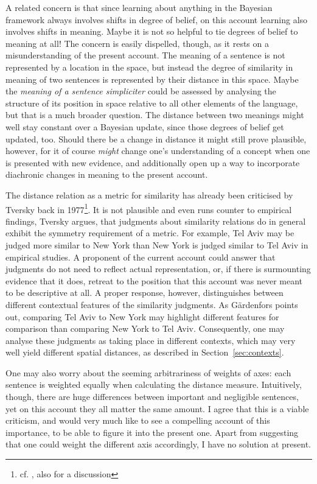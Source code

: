 \documentclass[11pt, a4paper]{scrartcl}
\renewcommand{\i}[1]{\emph{#1}}
\begin{document}
A related concern is that since learning about anything in the Bayesian framework always involves shifts in degree of belief, on this account learning also involves shifts in meaning. Maybe it is not so helpful to tie degrees of belief to meaning at all! The concern is easily dispelled, though, as it rests on a misunderstanding of the present account. The meaning of a sentence is not represented by a location in the space, but instead the degree of similarity in meaning of two sentences is represented by their distance in this space. Maybe the \i{meaning of a sentence simpliciter} could be assessed by analysing the structure of its position in space relative to all other elements of the language, but that is a much broader question. The distance between two meanings might well stay constant over a Bayesian update, since those degrees of belief get updated, too. Should there be a change in distance it might still prove plausible, however, for it of course \i{might} change one's understanding of a concept when one is presented with new evidence, and additionally open up a way to incorporate diachronic changes in meaning to the present account.

The distance relation as a metric for similarity has already been criticised by Tversky back in 1977\footnote{cf. \textcite{tversky1977features}, also \textcite[112]{gärdenfors2004conceptual} for a discussion}. It is not plausible and even runs counter to empirical findings, Tversky argues, that judgments about similarity relations do in general exhibit the symmetry requirement of a metric. For example, Tel Aviv may be judged more similar to New York than New York is judged similar to Tel Aviv in empirical studies. A proponent of the current account could answer that judgments do not need to reflect actual representation, or, if there is surmounting evidence that it does, retreat to the position that this account was never meant to be descriptive at all. A proper response, however, distinguishes between different contextual features of the similarity judgments. As Gärdenfors points out, comparing Tel Aviv to New York may highlight different features for comparison than comparing New York to Tel Aviv. Consequently, one may analyse these judgments as taking place in different contexts, which may very well yield different spatial distances, as described in Section~\ref{sec:contexts}.

One may also worry about the seeming arbitrariness of weights of axes: each sentence is weighted equally when calculating the distance measure. Intuitively, though, there are huge differences between important and negligible sentences, yet on this account they all matter the same amount. I agree that this is a viable criticism, and would very much like to see a compelling account of this importance, to be able to figure it into the present one. Apart from suggesting that one could weight the different axis accordingly, I have no solution at present.
\end{document}
